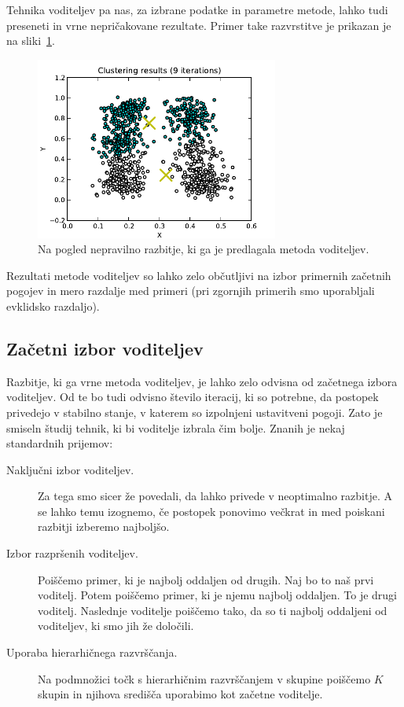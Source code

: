 Tehnika voditeljev pa nas, za izbrane podatke in parametre metode,
lahko tudi preseneti in vrne nepričakovane rezultate. Primer take
razvrstitve je prikazan je na sliki~\ref{f-kmeans-stripes}.

\begin{figure}[htbp]
\begin{center}
\includegraphics[width=8cm]{slike/kmeans-stripes.pdf}
\caption{Na pogled nepravilno razbitje, ki ga je predlagala metoda voditeljev.}
\label{f-kmeans-stripes}
\end{center}
\end{figure}

Rezultati metode voditeljev so lahko zelo občutljivi na izbor
primernih začetnih pogojev in mero razdalje med primeri (pri zgornjih
primerih smo uporabljali evklidsko razdaljo).

\subsection{Začetni izbor voditeljev}

Razbitje, ki ga vrne metoda voditeljev, je lahko zelo odvisna od
začetnega izbora voditeljev. Od te bo tudi odvisno število iteracij,
ki so potrebne, da postopek privedejo v stabilno stanje, v katerem so
izpolnjeni ustavitveni pogoji. Zato je smiseln študij tehnik, ki bi
voditelje izbrala čim bolje. Znanih je nekaj standardnih prijemov:

\begin{description}
\item[Naključni izbor voditeljev.] Za tega smo sicer že povedali, da
  lahko privede v neoptimalno razbitje. A se lahko temu izognemo, če
  postopek ponovimo večkrat in med poiskani razbitji izberemo
  najboljšo. 
\item[Izbor razpršenih voditeljev.] Poiščemo primer, ki je najbolj
  oddaljen od drugih. Naj bo to naš prvi voditelj. Potem poiščemo
  primer, ki je njemu najbolj oddaljen. To je drugi
  voditelj. Naslednje voditelje poiščemo tako, da so ti najbolj
  oddaljeni od voditeljev, ki smo jih že določili.
\item[Uporaba hierarhičnega razvrščanja.] Na podmnožici točk s
  hierarhičnim razvrščanjem v skupine poiščemo $K$ skupin in njihova
  središča uporabimo kot začetne voditelje. 
\end{description}

